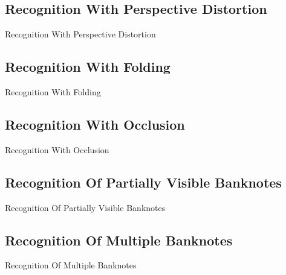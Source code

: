 \subsection*{Recognition With Perspective Distortion}
\begin{frame}{Recognition With Perspective Distortion}
	
\end{frame}


\subsection*{Recognition With Folding}
\begin{frame}{Recognition With Folding}
	
\end{frame}


\subsection*{Recognition With Occlusion}
\begin{frame}{Recognition With Occlusion}
	
\end{frame}


\subsection*{Recognition Of Partially Visible Banknotes}
\begin{frame}{Recognition Of Partially Visible Banknotes}
	
\end{frame}


\subsection*{Recognition Of Multiple Banknotes}
\begin{frame}{Recognition Of Multiple Banknotes}
	
\end{frame}
